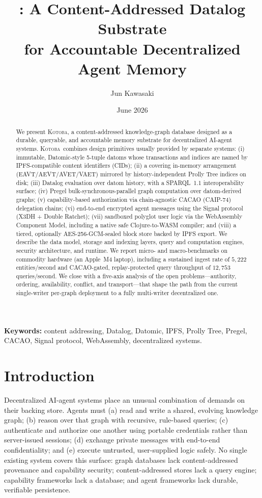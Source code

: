 \documentclass[11pt]{article}
\title{\textbf{\kotoba: A Content-Addressed Datalog Substrate\\
for Accountable Decentralized Agent Memory}}
\author[1]{Jun Kawasaki}
\affil[1]{com-junkawasaki / etzhayyim}
\date{June 2026}
\newcommand{\kotoba}{\textsc{Kotoba}}
\newcommand{\cid}{\textsf{CID}}
\begin{document}
\maketitle

\begin{abstract}
We present \kotoba, a content-addressed knowledge-graph database designed as a
durable, queryable, and accountable memory substrate for decentralized AI-agent
systems. \kotoba\ combines design primitives usually provided by separate
systems: (i) immutable, Datomic-style 5-tuple datoms whose transactions and
indices are named by IPFS-compatible content identifiers (\cid{}s); (ii) a
covering in-memory arrangement (EAVT/AEVT/AVET/VAET) mirrored by
history-independent Prolly Tree indices on disk; (iii) Datalog evaluation over
datom history, with a SPARQL~1.1 interoperability surface; (iv) Pregel
bulk-synchronous-parallel graph computation over datom-derived graphs; (v)
capability-based authorization via chain-agnostic CACAO (CAIP-74) delegation
chains; (vi) end-to-end encrypted agent messages using the Signal protocol
(X3DH + Double Ratchet); (vii) sandboxed polyglot user logic via the
WebAssembly Component Model, including a native safe Clojure-to-WASM compiler;
and (viii) a tiered, optionally AES-256-GCM-sealed block store backed by IPFS
export. We describe the data model, storage and indexing layers, query and
computation engines, security architecture, and runtime. We report micro- and
macro-benchmarks on commodity hardware (an Apple~M4 laptop), including a
sustained ingest rate of $5{,}222$ entities/second and CACAO-gated,
replay-protected query throughput of $12{,}753$ queries/second. We close with a
five-axis analysis of the open problems---authority, ordering, availability,
conflict, and transport---that shape the path from the current single-writer
per-graph deployment to a fully multi-writer decentralized one.
\end{abstract}

\noindent\textbf{Keywords:} content addressing, Datalog, Datomic, IPFS, Prolly
Tree, Pregel, CACAO, Signal protocol, WebAssembly, decentralized systems.

\section{Introduction}
\label{sec:intro}

Decentralized AI-agent systems place an unusual combination of demands on their
backing store. Agents must (a) read and write a shared, evolving knowledge graph;
(b) reason over that graph with recursive, rule-based queries; (c) authenticate
and authorize one another using portable credentials rather than server-issued
sessions; (d) exchange private messages with end-to-end confidentiality; and
(e) execute untrusted, user-supplied logic safely. No single existing system
covers this surface: graph databases lack content-addressed provenance and
capability security; content-addressed stores lack a query engine; capability
frameworks lack a database; and agent frameworks lack durable, verifiable
persistence.
\end{document}
